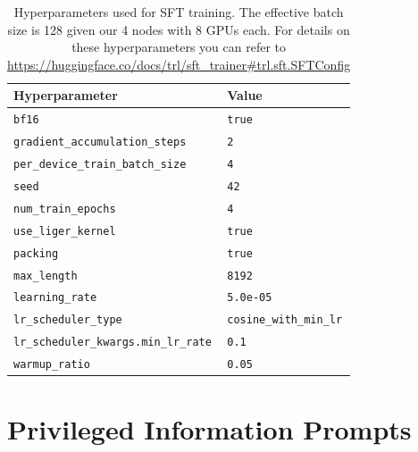 \begin{table}[H]
    \centering
    \small
    \begin{tabular}{ll}
        \toprule
        Hyperparameter & Value \\
        \midrule
        \texttt{bf16} & \texttt{true} \\
        \texttt{gradient\_accumulation\_steps} & \texttt{2} \\
        \texttt{per\_device\_train\_batch\_size} & \texttt{4} \\
        \texttt{seed} & \texttt{42} \\
        \texttt{num\_train\_epochs} & \texttt{4} \\
        \texttt{use\_liger\_kernel} & \texttt{true} \\
        \texttt{packing} & \texttt{true} \\
        \texttt{max\_length} & \texttt{8192} \\
        \texttt{learning\_rate} & \texttt{5.0e-05} \\
        \texttt{lr\_scheduler\_type} & \texttt{cosine\_with\_min\_lr} \\
        \texttt{lr\_scheduler\_kwargs.min\_lr\_rate} & \texttt{0.1} \\
        \texttt{warmup\_ratio} & \texttt{0.05} \\
        \bottomrule
    \end{tabular}
    \caption{Hyperparameters used for SFT training. The effective batch size is 128 given our 4 nodes with 8 GPUs each. For details on these hyperparameters you can refer to \protect\url{https://huggingface.co/docs/trl/sft_trainer\#trl.sft.SFTConfig}}
    \label{tab:sft_hyperparameters}
\end{table}

\section{Privileged Information Prompts} \label{app: pc_prompts}

